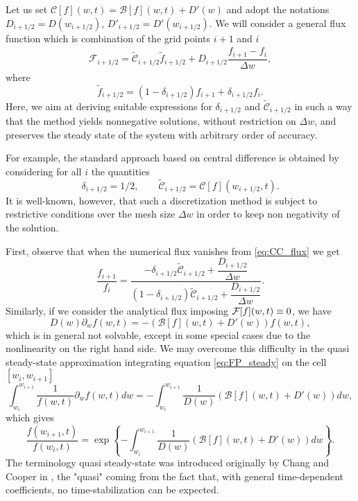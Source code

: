 \documentclass[a4paper]{article}
\theoremstyle{remark}\newtheorem{remark}{Remark}
\newcommand{\F}{\mathcal{F}}
\newcommand{\B}{\mathcal{B}}
\newcommand{\C}{\mathcal{C}}
\newcommand{\be}{\begin{equation}}
\newcommand{\ee}{\end{equation}}
\begin{document}
Let us set ${\C}[f](w,t)=\B[f](w,t)+D'(w)$ and adopt the notations $D_{i+1/2}=D(w_{i+1/2})$, $D'_{i+1/2}=D'(w_{i+1/2})$. We will consider a general flux function which is combination of the grid points $i+1$ and $i$ 
\be\begin{split}\label{eq:CC_flux}
\F_{i+ 1/2} = \tilde{\C}_{i+1/2}\tilde{f}_{i+1/2}+D_{i+1/2}\dfrac{f_{i+1}-f_i}{\Delta w},
\end{split}\ee
where 
\be\label{eq:f_CC}
\tilde{f}_{i+1/2}=(1-\delta_{i+1/2})f_{i+1}+\delta_{i+1/2}f_i.
\ee
Here, we aim at deriving suitable expressions for $\delta_{i+1/2}$ and $\tilde{\C}_{i+1/2}$ in such a way that the method yields nonnegative solutions, without restriction on $\Delta w$, and preserves the steady state of the system with arbitrary order of accuracy.

For example, the standard approach based on central difference is obtained by considering for all $i$ the quantities 
 \[
 \delta_{i+1/2}=1/2, \qquad \tilde{\C}_{i+1/2}={\C}[f](w_{i+1/2},t).
 \]
 It is well-known, however, that such a discretization method is subject to restrictive conditions over the mesh size $\Delta w$ in order to keep non negativity of the solution.  

First, observe that when the numerical flux vanishes from \eqref{eq:CC_flux} we get 
\[
\dfrac{f_{i+1}}{f_i} = \dfrac{-\delta_{i+1/2}\tilde{\C}_{i+1/2}+\dfrac{D_{i+1/2}}{\Delta w}}{(1-\delta_{i+1/2})\tilde{\C}_{i+1/2}+\dfrac{D_{i+1/2}}{\Delta w}}.
\]
Similarly, if we consider the analytical flux imposing ${\cal F}[f](w,t) \equiv 0$, we have
\be\label{eq:FP_steady}
D(w)\partial_w f(w,t) = -(\B[f](w,t)+D'(w))f(w,t),
\ee
which is in general not solvable, except in some special cases due to the nonlinearity on the right hand side. We may overcome this difficulty in the quasi steady-state approximation integrating equation \eqref{eq:FP_steady} on the cell $[w_i,w_{i+1}]$ 
\[
\int_{w_i}^{w_{i+1}}\dfrac{1}{f(w,t)}\partial_w f(w,t)dw = -\int_{w_i}^{w_{i+1}}\dfrac{1}{D(w)}(\B[f](w,t)+D'(w))dw,
\]
which gives
\be\label{eq:quasi_SS}
\dfrac{f(w_{i+1},t)}{f(w_i,t)} = \exp \left\{ -\int_{w_i}^{w_{i+1}}\dfrac{1}{D(w)}(\B[f](w,t)+D'(w))dw  \right\}.
\ee
The terminology quasi steady-state was introduced originally by Chang and Cooper in \cite{ChCo}, the "quasi" coming from the fact that, with general time-dependent coefficients, no time-stabilization can be expected.
\end{document}
